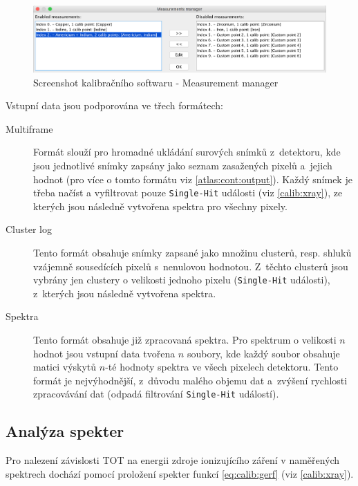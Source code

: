 \begin{figure}[th!]
	\begin{center}
		\includegraphics[width=15cm]{figures/calibsw_manager.png}
		\caption{Screenshot kalibračního softwaru - Measurement manager}
		\label{fig:calib:sw_measurmanag}
	\end{center}
\end{figure}

Vstupní data jsou podporována ve třech formátech:
\begin{description}
	\item[Multiframe] Formát slouží pro hromadné ukládání surových snímků z~detektoru, kde jsou jednotlivé snímky zapsány jako seznam zasažených pixelů a~jejich hodnot (pro více o tomto formátu viz \ref{atlas:cont:output}). Každý snímek je třeba načíst a vyfiltrovat pouze \texttt{Single-Hit} události (viz \ref{calib:xray}), ze kterých jsou následně vytvořena spektra pro všechny pixely.
	\item[Cluster log] Tento formát obsahuje snímky zapsané jako množinu clusterů, resp. shluků vzájemně sousedících pixelů s~nenulovou hodnotou. Z~těchto clusterů jsou vybrány jen clustery o velikosti jednoho pixelu (\texttt{Single-Hit} události), z~kterých jsou následně vytvořena spektra.
	\item[Spektra] Tento formát obsahuje již zpracovaná spektra. Pro spektrum o velikosti $n$ hodnot jsou vstupní data tvořena $n$ soubory, kde každý soubor obsahuje matici výskytů $n$-té hodnoty spektra ve všech pixelech detektoru. Tento formát je nejvýhodnější, z~důvodu malého objemu dat a~zvýšení rychlosti zpracovávání dat (odpadá filtrování \texttt{Single-Hit} událostí).
\end{description}


\subsection{Analýza spekter}\label{calib:sw:spektra}
Pro nalezení závislosti TOT na energii zdroje ionizujícího záření v naměřených spektrech
dochází pomocí proložení spekter funkcí \ref{eq:calib:gerf} (viz \ref{calib:xray}). 

